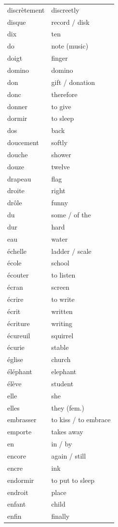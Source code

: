 \documentclass[12pt,a4paper]{article}
\begin{document}
\begin{longtable}{p{4cm} p{6cm}}
discrètement & discreetly \\
disque & record / disk \\
dix & ten \\
do & note (music) \\
doigt & finger \\
domino & domino \\
don & gift / donation \\
donc & therefore \\
donner & to give \\
dormir & to sleep \\
dos & back \\
doucement & softly \\
douche & shower \\
douze & twelve \\
drapeau & flag \\
droite & right \\
drôle & funny \\
du & some / of the \\
dur & hard \\
eau & water \\
échelle & ladder / scale \\
école & school \\
écouter & to listen \\
écran & screen \\
écrire & to write \\
écrit & written \\
écriture & writing \\
écureuil & squirrel \\
écurie & stable \\
église & church \\
éléphant & elephant \\
élève & student \\
elle & she \\
elles & they (fem.) \\
embrasser & to kiss / to embrace \\
emporte & takes away \\
en & in / by \\
encore & again / still \\
encre & ink \\
endormir & to put to sleep \\
endroit & place \\
enfant & child \\
enfin & finally \\

\end{longtable}
\end{document}
